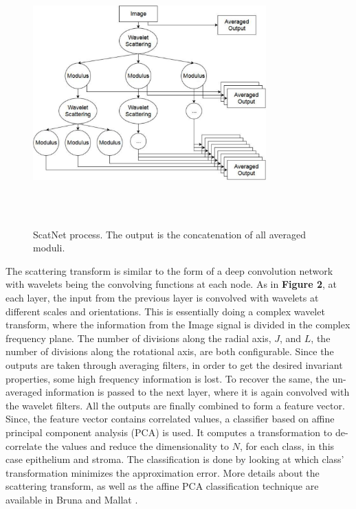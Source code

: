 \documentclass{article}
\begin{document}
\begin{figure}[b]
	\centering
	\includegraphics[width=0.8\textwidth,height=4in]{scatnet-process}
	\caption{ScatNet process. The output is the concatenation of all averaged moduli.}
\end{figure}

The scattering transform is similar to the form of a deep convolution network with
wavelets being the convolving functions at each node. As in \textbf{Figure 2}, at each
layer, the input from the previous layer is convolved with wavelets at different scales and
orientations. This is essentially doing a complex wavelet transform, where the
information from the Image signal is divided in the complex frequency plane.
\cite{Kingsbury2001} The  number of divisions along the radial axis, $J$, and $L$,
the number of divisions along the rotational axis, are both configurable. Since
the outputs are taken through averaging filters, in order to get the desired invariant
properties, some high frequency information is lost. To recover the same, the
un-averaged information is passed to the next layer, where it is again convolved
with the wavelet filters. All the outputs are finally combined to form a feature
vector. Since, the feature vector contains correlated values, a classifier based
on affine principal component analysis (PCA) is used. It computes a transformation
to de-correlate the values and reduce the dimensionality to $N$, for each class, in
this case epithelium and stroma. The classification is done by looking at which
class' transformation minimizes the approximation error. More details about the
scattering transform, as well as the affine PCA classification technique are available
in Bruna and Mallat \cite{Bruna2013}. 
\end{document}
